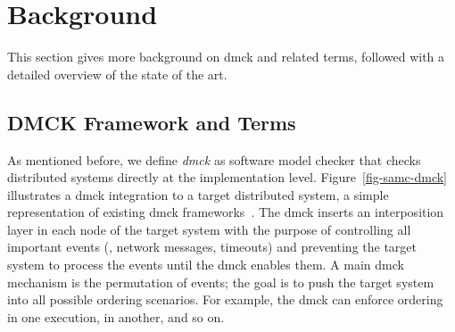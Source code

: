 
\section{Background}
\label{sec-mot}

This section gives more background on dmck and related terms,
followed with a detailed overview of the state of the art.  



\subsection{DMCK Framework and Terms}
\label{mot-bgterms}


As mentioned before, we define {\em dmck} as  software model checker
that checks distributed systems directly at the implementation level.
Figure~\ref{fig-samc-dmck} illustrates a dmck integration to a target
distributed system, a simple representation of existing dmck
frameworks~\cite{Guo+11-Demeter, Killian+07-LifeDeathMaceMC,
  Simsa+10-Dbug, Yang+09-Modist}.  The dmck inserts an interposition
layer in each node of the target system with the purpose of
controlling all important events (\eg, network messages, timeouts) and
preventing the target system to process the events until the dmck
enables them.  A main dmck mechanism is the permutation of events; the
goal is to push the target system into all possible ordering scenarios.
For example, the dmck can enforce  ordering in one execution,
 in another, and so on.




